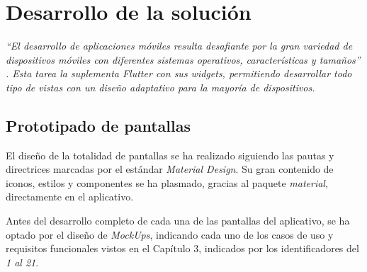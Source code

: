 \chapter{Desarrollo de la solución}
\textit{``El desarrollo de aplicaciones móviles resulta desafiante por la gran variedad de dispositivos
móviles con diferentes sistemas operativos, características y tamaños'' \cite{7021823}. Esta tarea
la suplementa Flutter con sus widgets, permitiendo
desarrollar todo tipo de vistas con un diseño adaptativo para la mayoría de dispositivos.
}

\section{Prototipado de pantallas}
El diseño de la totalidad de pantallas se ha realizado siguiendo las pautas y directrices marcadas por
el estándar \textit{Material Design}. Su gran contenido de iconos, estilos y componentes se ha plasmado,
gracias al paquete \textit{material}, directamente en el aplicativo.

Antes del desarrollo completo de cada una de las pantallas del aplicativo, se ha optado por el diseño de
\textit{MockUps}, indicando cada uno de los casos de uso y requisitos funcionales vistos en el Capítulo 
3, indicados por los identificadores del \textit{1 al 21}.

